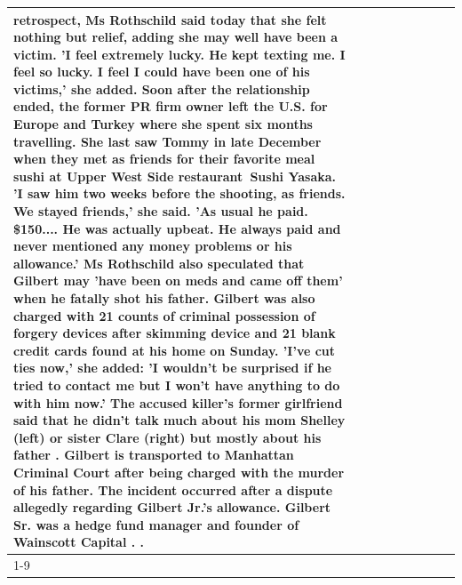 \begin{table}[H]
\begin{tabular}{lllrlllll}
retrospect, Ms Rothschild said today that she felt nothing but relief, adding she may well have been a victim. 'I feel extremely lucky. He kept texting me. I feel so lucky. I feel I could have been one of his victims,' she added. Soon after the relationship ended, the former PR firm owner left the U.S. for Europe and Turkey where she spent six months  travelling. She last saw Tommy in late December when they met as friends for their favorite meal sushi at Upper West Side restaurant Sushi Yasaka. 'I saw him two weeks before the shooting, as friends. We stayed friends,' she said. 'As usual he paid. \$150.... He was actually upbeat. He always paid and never mentioned any money problems or his allowance.' Ms Rothschild also speculated that Gilbert may 'have been on meds and came off them' when he fatally shot his father. Gilbert was also charged with 21 counts of criminal possession of forgery devices after skimming device and 21 blank credit cards found at his home on Sunday. 'I've cut ties now,' she added: 'I wouldn’t be surprised if he tried to contact me but I won’t have anything to do with him now.' The accused killer's former girlfriend said that he didn't talk much about his mom Shelley (left) or sister Clare (right) but mostly about his father . Gilbert is transported to Manhattan Criminal Court  after being charged with the murder of his father. The incident occurred after a dispute allegedly regarding Gilbert Jr.'s allowance. Gilbert Sr. was a hedge fund manager and founder of Wainscott Capital . . \\
\cline{1-9}

\end{tabular}
\end{table}
